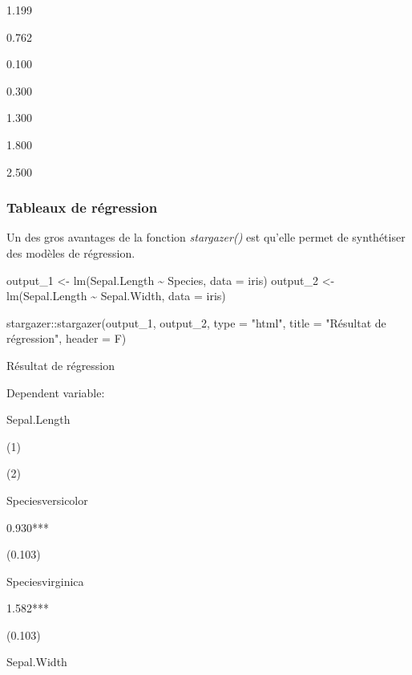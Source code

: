\documentclass[
]{book}
\newenvironment{Shaded}{\begin{snugshade}}{\end{snugshade}}
\newcommand{\AttributeTok}[1]{\textcolor[rgb]{0.77,0.63,0.00}{#1}}
\newcommand{\FunctionTok}[1]{\textcolor[rgb]{0.00,0.00,0.00}{#1}}
\newcommand{\NormalTok}[1]{#1}
\newcommand{\OtherTok}[1]{\textcolor[rgb]{0.56,0.35,0.01}{#1}}
\newcommand{\SpecialCharTok}[1]{\textcolor[rgb]{0.00,0.00,0.00}{#1}}
\newcommand{\StringTok}[1]{\textcolor[rgb]{0.31,0.60,0.02}{#1}}
\theoremstyle{definition}
\theoremstyle{definition}
\theoremstyle{definition}
\theoremstyle{definition}
\theoremstyle{remark}
\begin{document}
1.199

0.762

0.100

0.300

1.300

1.800

2.500

\hypertarget{tableaux-de-ruxe9gression}{%
\subsubsection{Tableaux de régression}\label{tableaux-de-ruxe9gression}}

Un des gros avantages de la fonction \emph{stargazer()} est qu'elle permet de synthétiser des modèles de régression.

\begin{Shaded}
\begin{Highlighting}[]
\NormalTok{output\_1  }\OtherTok{\textless{}{-}} \FunctionTok{lm}\NormalTok{(Sepal.Length }\SpecialCharTok{\textasciitilde{}}\NormalTok{ Species, }\AttributeTok{data =}\NormalTok{ iris)}
\NormalTok{output\_2  }\OtherTok{\textless{}{-}} \FunctionTok{lm}\NormalTok{(Sepal.Length }\SpecialCharTok{\textasciitilde{}}\NormalTok{ Sepal.Width, }\AttributeTok{data =}\NormalTok{ iris)}
\end{Highlighting}
\end{Shaded}

\begin{Shaded}
\begin{Highlighting}[]
\NormalTok{stargazer}\SpecialCharTok{::}\FunctionTok{stargazer}\NormalTok{(output\_1, output\_2, }\AttributeTok{type =} \StringTok{"html"}\NormalTok{, }
                     \AttributeTok{title =} \StringTok{"Résultat de régression"}\NormalTok{, }\AttributeTok{header =}\NormalTok{ F)}
\end{Highlighting}
\end{Shaded}

Résultat de régression

Dependent variable:

Sepal.Length

(1)

(2)

Speciesversicolor

0.930***

(0.103)

Speciesvirginica

1.582***

(0.103)

Sepal.Width
\end{document}
